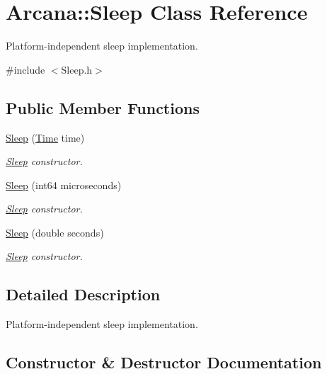 \hypertarget{class_arcana_1_1_sleep}{}\section{Arcana\+:\+:Sleep Class Reference}
\label{class_arcana_1_1_sleep}


Platform-\/independent sleep implementation.  




{\ttfamily \#include $<$Sleep.\+h$>$}

\subsection*{Public Member Functions}
\begin{DoxyCompactItemize}
\item 
\mbox{\hyperlink{class_arcana_1_1_sleep_a27eb99f8568acc83c7bcc86cbc710ba7}{Sleep}} (\mbox{\hyperlink{class_arcana_1_1_time}{Time}} time)
\begin{DoxyCompactList}\small\item\em \mbox{\hyperlink{class_arcana_1_1_sleep}{Sleep}} constructor. \end{DoxyCompactList}\item 
\mbox{\hyperlink{class_arcana_1_1_sleep_a5fc0c3cb0108e59f517a6ec13eb2d9e5}{Sleep}} (int64 microseconds)
\begin{DoxyCompactList}\small\item\em \mbox{\hyperlink{class_arcana_1_1_sleep}{Sleep}} constructor. \end{DoxyCompactList}\item 
\mbox{\hyperlink{class_arcana_1_1_sleep_aa483019d78bd041cddda7b781671b971}{Sleep}} (double seconds)
\begin{DoxyCompactList}\small\item\em \mbox{\hyperlink{class_arcana_1_1_sleep}{Sleep}} constructor. \end{DoxyCompactList}\end{DoxyCompactItemize}


\subsection{Detailed Description}
Platform-\/independent sleep implementation. 

\subsection{Constructor \& Destructor Documentation}
\mbox{\label{class_arcana_1_1_sleep_a27eb99f8568acc83c7bcc86cbc710ba7}} 
